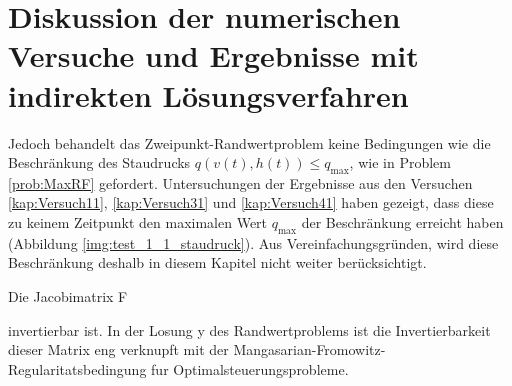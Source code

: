 \section{Diskussion der numerischen Versuche und Ergebnisse mit indirekten Lösungsverfahren}
Jedoch behandelt das Zweipunkt-Randwertproblem keine Bedingungen wie die Beschränkung des Staudrucks $q(v(t),h(t)) \leq q_{\max}$, wie in Problem \ref{prob:MaxRF} gefordert. Untersuchungen der Ergebnisse aus den Versuchen \ref{kap:Versuch11}, \ref{kap:Versuch31} und  \ref{kap:Versuch41} haben gezeigt, dass diese zu keinem Zeitpunkt den maximalen Wert $q_{\max}$ der Beschränkung erreicht haben (Abbildung \ref{img:test_1_1_staudruck}). Aus Vereinfachungsgründen, wird diese Beschränkung deshalb in diesem Kapitel nicht weiter berücksichtigt.




Die Jacobimatrix F

invertierbar ist. In der Losung y des Randwertproblems ist die Invertierbarkeit dieser Matrix eng verknupft mit der Mangasarian-Fromowitz-Regularitatsbedingung
fur Optimalsteuerungsprobleme.
